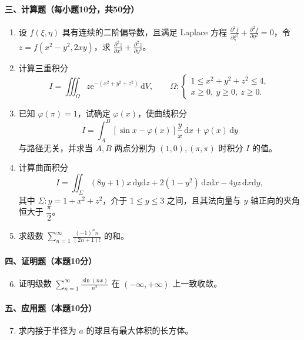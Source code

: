 \paragraph*{三、计算题（每小题10分，共50分）}
\begin{enumerate}
  \item 设 \(f(\xi,\eta)\) 具有连续的二阶偏导数，且满足 Laplace 方程
  \(\displaystyle \frac{\partial^2 f}{\partial \xi^2}+\frac{\partial^2 f}{\partial \eta^2}=0\)，令
  \(z=f(x^2-y^2,2xy)\)，求
  \(\displaystyle \frac{\partial^2z}{\partial x^2}+\frac{\partial^2z}{\partial y^2}\)。

  \item 计算三重积分
  \[
    I=\iiint_\Omega z\mathrm{e}^{-(x^2+y^2+z^2)}\,\mathrm{d}V,
    \qquad
    \Omega:\begin{cases}
      1\le x^2+y^2+z^2\le 4,\\
      x\ge 0,\ y\ge 0,\ z\ge 0.
    \end{cases}
  \]

  \item 已知 \(\varphi(\pi)=1\)，试确定 \(\varphi(x)\)，使曲线积分
  \[
    I=\int_A^B\left[\sin x-\varphi(x)\right]\frac{y}{x}\,\mathrm{d}x+\varphi(x)\,\mathrm{d}y
  \]
  与路径无关，并求当 \(A,B\) 两点分别为 \((1,0),(\pi,\pi)\) 时积分 \(I\) 的值。

  \item 计算曲面积分
  \[
    I=\iint_\Sigma (8y+1)x\,\mathrm{d}y\mathrm{d}z+2(1-y^2)\,\mathrm{d}z\mathrm{d}x-4yz\,\mathrm{d}x\mathrm{d}y,
  \]
  其中 \(\Sigma:y=1+x^2+z^2\)，介于 \(1\le y\le 3\) 之间，且其法向量与 \(y\) 轴正向的夹角恒大于 \(\dfrac{\pi}{2}\)。

  \item 求级数 \(\displaystyle \sum_{n=1}^{\infty}\frac{(-1)^n n}{(2n+1)!}\) 的和。
\end{enumerate}

\paragraph*{四、证明题（本题10分）}
\begin{enumerate}
  \setcounter{enumi}{5}
  \item 证明级数 \(\displaystyle \sum_{n=1}^{\infty}\frac{\sin(nx)}{n^2}\) 在 \((-\infty,+\infty)\) 上一致收敛。
\end{enumerate}

\paragraph*{五、应用题（本题10分）}
\begin{enumerate}
  \setcounter{enumi}{6}
  \item 求内接于半径为 \(a\) 的球且有最大体积的长方体。
\end{enumerate}

